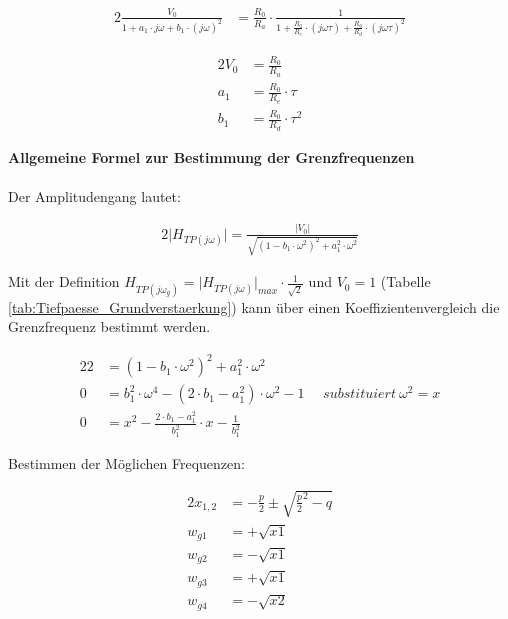\begin{alignat}{2}
\frac{V_{0}}{1 + a_{1} \cdot j \omega + b_{1} \cdot \left ( j \omega \right)^2} &= \frac{R_{0}}{R_{a}} \cdot \frac{1}{1+\frac{R_{0}}{R_{e}} \cdot  \left(j \omega \tau \right) + \frac{R_{0}}{R_{d}} \cdot \left ( j \omega \tau \right)^2}
\end{alignat}

\begin{alignat}{2}
V_{0} &= \frac{R_{0}}{R_{a}}\\
a_{1} &= \frac{R_{0}}{R_{e}} \cdot \tau\\
b_{1} &= \frac{R_{0}}{R_{d}} \cdot \tau^2
\end{alignat}

\noindent \textbf{Allgemeine Formel zur Bestimmung der Grenzfrequenzen}\\\\

\noindent Der Amplitudengang lautet:

\begin{alignat}{2}
\lvert H_{TP (j \omega)} \rvert = \frac{\lvert V_{0} \rvert}{\sqrt{\left(1 - b_{1} \cdot \omega^2 \right)^2 + a_{1}^2 \cdot \omega^2}}
\end{alignat}

\noindent Mit der Definition $H_{TP (j \omega_{g})} = \lvert H_{TP (j \omega)} \rvert_{max} \cdot \frac{1}{\sqrt{2}}$ und $V_{0} = 1$ (Tabelle \ref{tab:Tiefpaesse_Grundverstaerkung}) kann über einen Koeffizientenvergleich die Grenzfrequenz bestimmt werden.

\begin{alignat}{2}
2 &= \left(1 - b_{1} \cdot \omega^2 \right)^2 + a_{1}^2 \cdot \omega^2\\
0 &= b_{1}^2 \cdot \omega^4 - (2\cdot b_{1} - a_{1}^2) \cdot \omega^2 - 1~~~~~~substituiert~\omega^2 = x\\
0 &= x^2 - \frac{2 \cdot b_{1} - a_{1}^2}{b_{1}^2} \cdot x - \frac{1}{b_{1}^2}
\end{alignat}

\noindent Bestimmen der Möglichen Frequenzen:

\begin{alignat}{2}
x_{1,2} &= -\frac{p}{2} \pm \sqrt{\frac{p}{2}^2 - q}\\
w_{g1} &= +\sqrt{x1}\\
w_{g2} &= -\sqrt{x1}\\
w_{g3} &= +\sqrt{x1}\\
w_{g4} &= -\sqrt{x2}
\end{alignat}

